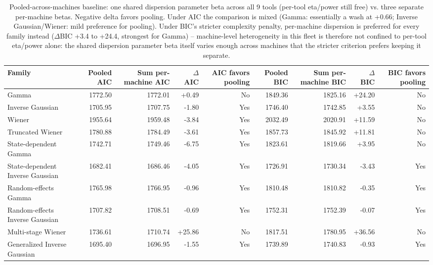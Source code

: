 \begin{table}[t]
\centering
\caption{Pooled-across-machines baseline: one shared dispersion parameter beta across all 9 tools (per-tool eta/power still free) vs. three separate per-machine betas. Negative delta favors pooling. Under AIC the comparison is mixed (Gamma: essentially a wash at +0.66; Inverse Gaussian/Wiener: mild preference for pooling). Under BIC's stricter complexity penalty, per-machine dispersion is preferred for every family instead ($\Delta$BIC +3.4 to +24.4, strongest for Gamma) -- machine-level heterogeneity in this fleet is therefore not confined to per-tool eta/power alone: the shared dispersion parameter beta itself varies enough across machines that the stricter criterion prefers keeping it separate.}
\label{tab:pooled-baseline}
\begin{tabular}{lrrrrrrrr}
\toprule
Family & Pooled AIC & Sum per-machine AIC & $\Delta$ AIC & AIC favors pooling & Pooled BIC & Sum per-machine BIC & $\Delta$ BIC & BIC favors pooling \\
\midrule
Gamma & 1772.50 & 1772.01 & +0.49 & No & 1849.36 & 1825.16 & +24.20 & No \\
Inverse Gaussian & 1705.95 & 1707.75 & -1.80 & Yes & 1746.40 & 1742.85 & +3.55 & No \\
Wiener & 1955.64 & 1959.48 & -3.84 & Yes & 2032.49 & 2020.91 & +11.59 & No \\
Truncated Wiener & 1780.88 & 1784.49 & -3.61 & Yes & 1857.73 & 1845.92 & +11.81 & No \\
State-dependent Gamma & 1742.71 & 1749.46 & -6.75 & Yes & 1823.61 & 1819.66 & +3.95 & No \\
State-dependent Inverse Gaussian & 1682.41 & 1686.46 & -4.05 & Yes & 1726.91 & 1730.34 & -3.43 & Yes \\
Random-effects Gamma & 1765.98 & 1766.95 & -0.96 & Yes & 1810.48 & 1810.82 & -0.35 & Yes \\
Random-effects Inverse Gaussian & 1707.82 & 1708.51 & -0.69 & Yes & 1752.31 & 1752.39 & -0.07 & Yes \\
Multi-stage Wiener & 1736.61 & 1710.74 & +25.86 & No & 1817.51 & 1780.95 & +36.56 & No \\
Generalized Inverse Gaussian & 1695.40 & 1696.95 & -1.55 & Yes & 1739.89 & 1740.83 & -0.93 & Yes \\
\bottomrule
\end{tabular}
\end{table}
